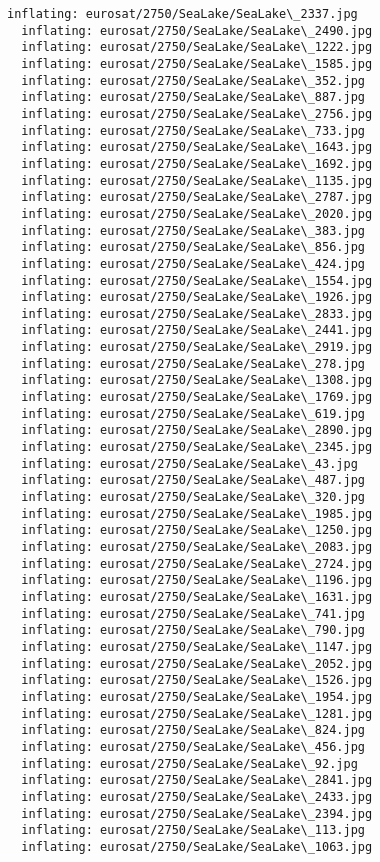 \documentclass[11pt]{article}
\begin{document}
\begin{Verbatim}[commandchars=\\\{\}]
  inflating: eurosat/2750/SeaLake/SeaLake\_2337.jpg
  inflating: eurosat/2750/SeaLake/SeaLake\_2490.jpg
  inflating: eurosat/2750/SeaLake/SeaLake\_1222.jpg
  inflating: eurosat/2750/SeaLake/SeaLake\_1585.jpg
  inflating: eurosat/2750/SeaLake/SeaLake\_352.jpg
  inflating: eurosat/2750/SeaLake/SeaLake\_887.jpg
  inflating: eurosat/2750/SeaLake/SeaLake\_2756.jpg
  inflating: eurosat/2750/SeaLake/SeaLake\_733.jpg
  inflating: eurosat/2750/SeaLake/SeaLake\_1643.jpg
  inflating: eurosat/2750/SeaLake/SeaLake\_1692.jpg
  inflating: eurosat/2750/SeaLake/SeaLake\_1135.jpg
  inflating: eurosat/2750/SeaLake/SeaLake\_2787.jpg
  inflating: eurosat/2750/SeaLake/SeaLake\_2020.jpg
  inflating: eurosat/2750/SeaLake/SeaLake\_383.jpg
  inflating: eurosat/2750/SeaLake/SeaLake\_856.jpg
  inflating: eurosat/2750/SeaLake/SeaLake\_424.jpg
  inflating: eurosat/2750/SeaLake/SeaLake\_1554.jpg
  inflating: eurosat/2750/SeaLake/SeaLake\_1926.jpg
  inflating: eurosat/2750/SeaLake/SeaLake\_2833.jpg
  inflating: eurosat/2750/SeaLake/SeaLake\_2441.jpg
  inflating: eurosat/2750/SeaLake/SeaLake\_2919.jpg
  inflating: eurosat/2750/SeaLake/SeaLake\_278.jpg
  inflating: eurosat/2750/SeaLake/SeaLake\_1308.jpg
  inflating: eurosat/2750/SeaLake/SeaLake\_1769.jpg
  inflating: eurosat/2750/SeaLake/SeaLake\_619.jpg
  inflating: eurosat/2750/SeaLake/SeaLake\_2890.jpg
  inflating: eurosat/2750/SeaLake/SeaLake\_2345.jpg
  inflating: eurosat/2750/SeaLake/SeaLake\_43.jpg
  inflating: eurosat/2750/SeaLake/SeaLake\_487.jpg
  inflating: eurosat/2750/SeaLake/SeaLake\_320.jpg
  inflating: eurosat/2750/SeaLake/SeaLake\_1985.jpg
  inflating: eurosat/2750/SeaLake/SeaLake\_1250.jpg
  inflating: eurosat/2750/SeaLake/SeaLake\_2083.jpg
  inflating: eurosat/2750/SeaLake/SeaLake\_2724.jpg
  inflating: eurosat/2750/SeaLake/SeaLake\_1196.jpg
  inflating: eurosat/2750/SeaLake/SeaLake\_1631.jpg
  inflating: eurosat/2750/SeaLake/SeaLake\_741.jpg
  inflating: eurosat/2750/SeaLake/SeaLake\_790.jpg
  inflating: eurosat/2750/SeaLake/SeaLake\_1147.jpg
  inflating: eurosat/2750/SeaLake/SeaLake\_2052.jpg
  inflating: eurosat/2750/SeaLake/SeaLake\_1526.jpg
  inflating: eurosat/2750/SeaLake/SeaLake\_1954.jpg
  inflating: eurosat/2750/SeaLake/SeaLake\_1281.jpg
  inflating: eurosat/2750/SeaLake/SeaLake\_824.jpg
  inflating: eurosat/2750/SeaLake/SeaLake\_456.jpg
  inflating: eurosat/2750/SeaLake/SeaLake\_92.jpg
  inflating: eurosat/2750/SeaLake/SeaLake\_2841.jpg
  inflating: eurosat/2750/SeaLake/SeaLake\_2433.jpg
  inflating: eurosat/2750/SeaLake/SeaLake\_2394.jpg
  inflating: eurosat/2750/SeaLake/SeaLake\_113.jpg
  inflating: eurosat/2750/SeaLake/SeaLake\_1063.jpg

\end{Verbatim}
\end{document}
